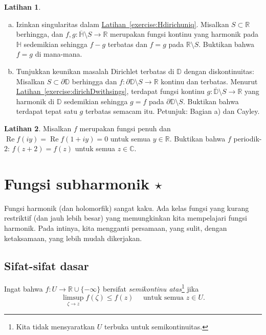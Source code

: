 \documentclass[12pt,openany]{book}
\renewcommand{\Re}{\operatorname{Re}}
\newcommand{\C}{{\mathbb{C}}}
\newcommand{\R}{{\mathbb{R}}}
\newcommand{\D}{{\mathbb{D}}}
\newcommand{\bH}{{\mathbb{H}}}
\newcommand{\myindex}[1]{#1\index{#1}}
\theoremstyle{plain}
\theoremstyle{remark}
\theoremstyle{definition}
\newenvironment{exbox}{%
    \def\FrameCommand{\vrule width 1pt \relax\hspace{10pt}}%
    \MakeFramed{\advance\hsize-\width\FrameRestore}%
}{%
    \endMakeFramed
}
\newenvironment{exparts}{%
    \leavevmode\begin{enumerate}[a),noitemsep,topsep=0pt,parsep=0pt,partopsep=0pt]
}{%
    \end{enumerate}
}
\theoremstyle{exercise}
\newtheorem{exercise}{Latihan}[section]
\theoremstyle{example}
\newcommand{\exerciseref}[1]{\hyperref[#1]{Latihan~\ref*{#1}}}
\begin{document}
\begin{exbox}
\begin{exercise}
\begin{exparts}
\item
Izinkan singularitas dalam \exerciseref{exercise:Hdirichuniq}.
Misalkan $S \subset \R$ berhingga, dan
$f,g \colon \overline{\bH} \setminus S \to \R$ merupakan 
fungsi kontinu yang harmonik pada $\bH$ sedemikian sehingga $f-g$ terbatas dan
$f=g$ pada $\R \setminus S$.  Buktikan bahwa $f=g$ di mana-mana.
\item
Tunjukkan keunikan masalah Dirichlet terbatas di $\D$ dengan
diskontinuitas: Misalkan $S \subset \partial \D$ berhingga dan
$f \colon \partial \D \setminus S \to \R$ kontinu dan terbatas.
Menurut \exerciseref{exercise:dirichDwithsings}, terdapat fungsi kontinu $g \colon
\overline{\D} \setminus S \to \R$ yang harmonik di $\D$ sedemikian sehingga $g=f$ pada
$\partial \D \setminus S$.  Buktikan bahwa terdapat tepat satu $g$ terbatas semacam itu.
Petunjuk: Bagian a) dan Cayley.
\end{exparts}
\end{exercise}

\begin{exercise}
Misalkan $f$ merupakan fungsi penuh dan
$\Re f(iy) = \Re f(1+iy) = 0$ untuk semua $y \in \R$.  Buktikan
bahwa $f$ periodik-$2$: $f(z+2)=f(z)$ untuk semua $z \in \C$.
\end{exercise}
\end{exbox}


\section{Fungsi subharmonik \texorpdfstring{$\star$}{*}}
\label{sec:subharmonic}

Fungsi harmonik (dan holomorfik) sangat kaku.
Ada kelas fungsi yang kurang restriktif (dan jauh lebih besar) yang memungkinkan
kita mempelajari fungsi harmonik.  Pada intinya, kita mengganti persamaan, yang
sulit, dengan ketaksamaan, yang lebih mudah dikerjakan.

\subsection{Sifat-sifat dasar}

Ingat bahwa $f \colon U \to \R \cup \{ -\infty \}$
bersifat \emph{\myindex{semikontinu atas}}\footnote{%
Kita tidak mensyaratkan $U$ terbuka untuk semikontinuitas.}
jika 
\begin{equation*}
\limsup_{\zeta \to z} f(\zeta) \leq f(z) \quad \text{ untuk semua } z \in U.
\end{equation*}
\end{document}
